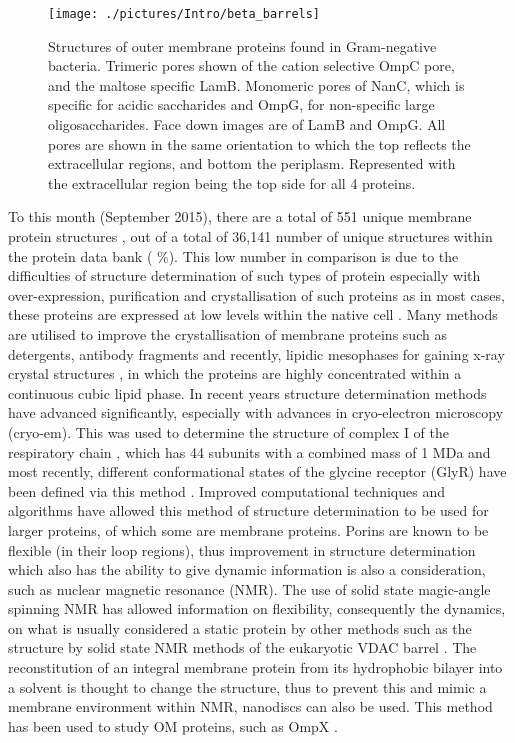 \begin{figure}[H]
\begin{center}
\texttt{[image: ./pictures/Intro/beta\_barrels]}
\caption[Structures of uuter membrane proteins.] {Structures of outer membrane proteins found in Gram-negative bacteria. Trimeric pores shown of the cation selective OmpC pore, and the maltose specific LamB. Monomeric pores of NanC, which is specific for acidic saccharides and OmpG, for non-specific large oligosaccharides. Face down images are of LamB and OmpG. All pores are shown in the same orientation to which the top reflects the extracellular regions, and bottom the periplasm. Represented with the extracellular region being the top side for all 4 proteins. }
\label{fig:beta_barrels}
\end{center}
\end{figure}


To this month (September 2015), there are a total of 551 unique membrane protein structures \cite{White2015}, out of a total of 36,141 number of unique structures within the protein data bank ( \%). This low number in comparison is due to the difficulties of structure determination of such types of protein especially with over-expression, purification and crystallisation of such proteins \cite{Werten2002} as in most cases, these proteins are expressed at low levels within the native cell \cite{Tate2001}. Many methods are utilised to improve the crystallisation of membrane proteins such as detergents, antibody fragments and recently, lipidic mesophases for gaining x-ray crystal structures \cite{Caffrey2009}, in which the proteins are highly concentrated within a continuous cubic lipid phase.  In recent years structure determination methods have advanced significantly, especially with advances in cryo-electron microscopy (cryo-em). This was used to determine the structure of complex I of the respiratory chain \cite{Vinothkumar2014}, which has 44 subunits with a combined mass of 1 MDa and most recently, different conformational states of the glycine receptor (GlyR) have been defined via this method \cite{Du2015}. Improved computational techniques and algorithms have allowed this method of structure determination to be used for larger proteins, of which some are membrane proteins. Porins are known to be flexible (in their loop regions), thus improvement in structure determination which also has the ability to give dynamic information is also a consideration, such as nuclear magnetic resonance (NMR). The use of solid state magic-angle spinning NMR has allowed information on flexibility, consequently the dynamics, on what is usually considered a static protein by other methods \cite{Hiller2005} such as the structure by solid state NMR methods of the eukaryotic VDAC barrel \cite{Hiller2008}. The reconstitution of an integral membrane protein from its hydrophobic bilayer into a solvent is thought to change the structure, thus to prevent this and mimic a membrane environment within NMR, nanodiscs can also be used. This method has been used to study OM proteins, such as OmpX \cite{Hagn2013}.

